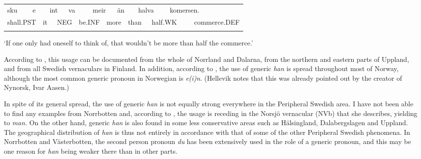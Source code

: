 \begin{tabular}{llllllllllllllll}
\lsptoprule
sku & \multicolumn{2}{l}{e

} & \multicolumn{2}{l}{int

} & \multicolumn{2}{l}{va

} & \multicolumn{2}{l}{meir

} & \multicolumn{2}{l}{än

} & \multicolumn{2}{l}{halva

} & \multicolumn{2}{l}{komersen.

} & \\
\multicolumn{2}{l}{shall.PST 

} & \multicolumn{2}{l}{it

} & \multicolumn{2}{l}{NEG

} & \multicolumn{2}{l}{be.INF

} & \multicolumn{2}{l}{more

} & \multicolumn{2}{l}{than

} & \multicolumn{2}{l}{half.WK

} & \multicolumn{2}{l}{commerce.DEF

}\\
\lspbottomrule
\end{tabular}

\begin{styleTranslation}
‘If one only had oneself to think of, that wouldn’t be more than half the commerce.’

\end{styleTranslation}

\begin{styleBodyTextFirst}
According to \citet[84]{Westerberg2004}, this usage can be documented from the whole of Norrland and Dalarna, from the northern and eastern parts of Uppland, and from all Swedish vernaculars in Finland. In addition, according to \citet[48]{Hellevik1979}, the use of generic \textit{han} is spread throughout most of Norway, although the most common generic pronoun in Norwegian is \textit{e(i)n}. (Hellevik notes that this was already pointed out by the creator of Nynorsk, Ivar Aasen.)

\end{styleBodyTextFirst}

\begin{styleBodytextC}
In spite of its general spread, the use of generic \textit{han} is not equally strong everywhere in the Peripheral Swedish area. I have not been able to find any examples from Norrbotten and, according to \citet[85]{Westerberg2004}, the usage is receding in the Norsjö vernacular (NVb) that she describes, yielding to \textit{man. }On the other hand, generic \textit{han} is also found in some less conservative areas such as Hälsingland, Dalabergslagen and Uppland. The geographical distribution of \textit{han} is thus not entirely in accordance with that of some of the other Peripheral Swedish phenomena. In Norrbotten and Västerbotten, the second person pronoun \textit{du} has been extensively used in the role of a generic pronoun, and this may be one reason for \textit{han} being weaker there than in other parts. 

\end{styleBodytextC}

